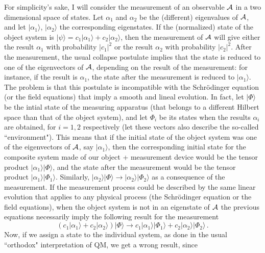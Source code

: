\documentclass[12pt]{article}
\begin{document}
For simplicity's sake, I will consider the measurement of an
observable ${\cal A}$ in a two dimensional space of states. Let
$\alpha_1$ and $\alpha_2$ be the (different) eigenvalues of ${\cal
A}$, and let $\vert \alpha_1\rangle$, $\vert \alpha_2\rangle$ the
corresponding eigenstates. If the (normalized) state of the object
system is $\vert\psi\rangle = c_1\vert \alpha_1\rangle+c_2\vert
\alpha_2\rangle$, then the measurement of ${\cal A}$ will give either
the result $\alpha_1$ with probability $\vert c_1\vert^2$ or the
result $\alpha_2$ with probability $\vert c_2\vert^2$.  After the
measurement, the usual collapse postulate implies that the state is
reduced to one of the eigenvectors of ${\cal A}$, depending on the
result of the measurement: for instance, if the result is $\alpha_1$,
the state after the measurement is reduced to $\vert
\alpha_1\rangle$. The problem is that this postulate is incompatible
with the Schr\"odinger equation (or the field equations) that imply a
smooth and lineal evolution. In fact, let $\vert\Phi\rangle$ be the
intial state of the measuring apparatus (that belongs to a different
Hilbert space than that of the object system), and let $\Phi_i$ be its
states when the results $\alpha_i$ are obtained, for $i=1,2$
respectively (let these vectors also describe the so-called
``environment"). This means that if the initial state of the object
system was one of the eigenvectors of ${\cal A}$, say $\vert
\alpha_1\rangle$, then the corresponding initial state for the
composite system made of our object + measurement device would be the
tensor product $\vert \alpha_1\rangle\vert\Phi\rangle$, and the state
after the measurement would be the tensor product $\vert
\alpha_1\rangle\vert\Phi_1\rangle$. Similarly, $\vert
\alpha_2\rangle\vert\Phi\rangle\to\vert
\alpha_2\rangle\vert\Phi_2\rangle$ as a consequence of the
measurement. If the measurement process could be described by the same
linear evolution that applies to any physical process (the
Schr\"odinger equation or the field equations), when the object system
is not in an eigenstate of ${\cal A}$ the previous equations
necessarily imply the following result for the measurement
\begin{equation}
(c_1\vert \alpha_1\rangle+c_2\vert \alpha_2\rangle)
\vert\Phi\rangle\to c_1\vert \alpha_1\rangle\vert\Phi_1\rangle +
c_2\vert \alpha_2\rangle\vert\Phi_2\rangle\,. \label{eq:1}
\end{equation}
Now, if we assign a state to the individual system, as done in the
usual ``orthodox" interpretation of QM, we get a wrong result, since
\end{document}
